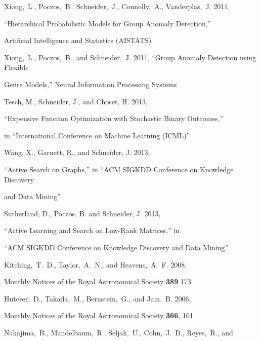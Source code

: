 \documentclass[prd,nofootbib,floatfix,11pt,tightenlines,nofootinbib]{revtex4}
\begin{document}
\begin{thebibliography}{99}

Xiong,~L., Poczos,~B., Schneider,~J., Connolly,~A., Vanderplas,~J. 2011,

``Hierarchical Probabilistic Models for Group Anomaly Detection,''

Artificial Intelligence and Statistics (AISTATS)




Xiong,~L., Poczos,~B., and Schneider,~J. 2011, ``Group Anomaly Detection using Flexible

Genre Models,'' Neural Information Processing Systems




Tesch, M., Schneider, J., and Choset, H. 2013,

``Expensive Funciton Optimization with Stochastic Binary Outcomes,''

in ``International Conference on Machine Learning (ICML)''




Wang, X., Garnett, R., and Schneider, J. 2013,

``Active Search on Graphs,'' in ``ACM SIGKDD Conference on Knowledge Discovery

and Data Mining''




Sutherland, D., Poczos, B. and Schneider, J. 2013,

``Active Learning and Search on Low-Rank Matrices,'' in

``ACM SIGKDD Conference on Knowledge Discovery and Data Mining''




Kitching,~T.~D., Taylor,~A.~N., and Heavens,~A.~F. 2008,

Monthly Notices of the Royal Astronomical Society {\bf 389} 173




Huterer,~D., Takada,~M., Bernstein,~G., and Jain,~B. 2006,

Monthly Notices of the Royal Astronomical Society {\bf 366}, 101




Nakajima,~R., Mandelbaum,~R., Seljak,~U., Cohn,~J.~D., Reyes,~R., and


\end{thebibliography}
\end{document}
